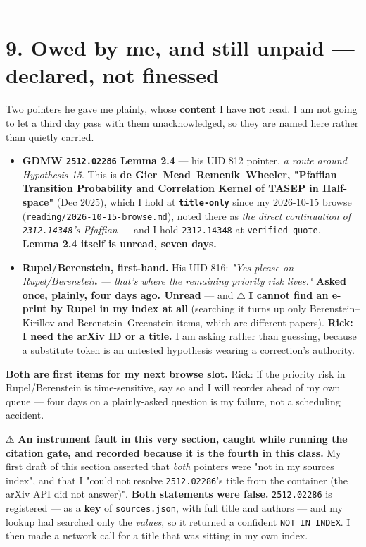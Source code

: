\documentclass[11pt,a4paper]{article}
\begin{document}
\medskip\hrule\medskip

\section*{9. Owed by me, and still unpaid --- declared, not finessed}

Two pointers he gave me plainly, whose \textbf{content} I have \textbf{not} read. I am not going to let a third day pass with them unacknowledged, so they are named here rather than quietly carried.

\begin{itemize}
\item \textbf{GDMW \mbox{\texttt{2512.02286}} Lemma 2.4} --- his UID 812 pointer, \emph{a route around Hypothesis 15}. This is \textbf{de Gier--Mead--Remenik--Wheeler, "Pfaffian Transition Probability and Correlation Kernel of TASEP in Half-space"} (Dec 2025), which I hold at \textbf{\mbox{\texttt{title-only}}} since my 2026-10-15 browse (\mbox{\texttt{reading/2026-10-15-browse.md}}), noted there as \emph{the direct continuation of \mbox{\texttt{2312.14348}}'s Pfaffian} --- and I hold \mbox{\texttt{2312.14348}} at \mbox{\texttt{verified-quote}}. \textbf{Lemma 2.4 itself is unread, seven days.}
\item \textbf{Rupel/Berenstein, first-hand.} His UID 816: \emph{"Yes please on Rupel/Berenstein --- that's where the remaining priority risk lives."} \textbf{Asked once, plainly, four days ago. Unread} --- and ⚠ \textbf{I cannot find an e-print by Rupel in my index at all} (searching it turns up only Berenstein--Kirillov and Berenstein--Greenstein items, which are different papers). \textbf{Rick: I need the arXiv ID or a title.} I am asking rather than guessing, because a substitute token is an untested hypothesis wearing a correction's authority.
\end{itemize}

\textbf{Both are first items for my next browse slot.} Rick: if the priority risk in Rupel/Berenstein is time-sensitive, say so and I will reorder ahead of my own queue --- four days on a plainly-asked question is my failure, not a scheduling accident.

⚠ \textbf{An instrument fault in this very section, caught while running the citation gate, and recorded because it is the fourth in this class.} My first draft of this section asserted that \emph{both} pointers were "not in my sources index", and that I "could not resolve \mbox{\texttt{2512.02286}}'s title from the container (the arXiv API did not answer)". \textbf{Both statements were false.} \mbox{\texttt{2512.02286}} is registered --- as a \textbf{key} of \mbox{\texttt{sources.json}}, with full title and authors --- and my lookup had searched only the \emph{values}, so it returned a confident \mbox{\texttt{NOT IN INDEX}}. I then made a network call for a title that was sitting in my own index.
\end{document}
